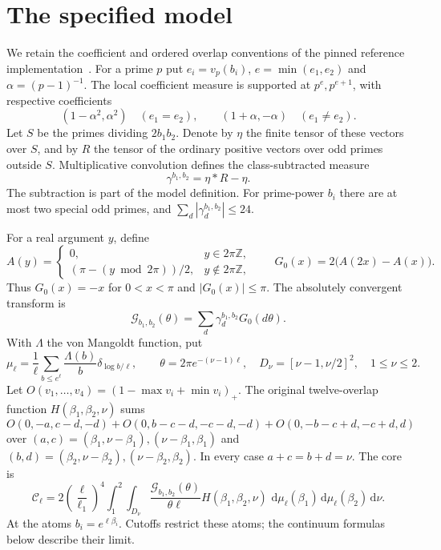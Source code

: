 \documentclass[11pt]{article}
\newcommand{\dd}{\,\mathrm d}
\newcommand{\Core}{\mathcal C}
\newcommand{\G}{\mathcal G}
\begin{document}
\section{The specified model}\label{sec:model}
We retain the coefficient and ordered overlap conventions of the
pinned reference implementation~\cite{reference}. For a prime $p$ put
$e_i=v_p(b_i)$, $e=\min(e_1,e_2)$ and $\alpha=(p-1)^{-1}$.
The local coefficient measure is supported at $p^e,p^{e+1}$, with
respective coefficients
\[
 (1-\alpha^2,\alpha^2)\quad(e_1=e_2),\qquad
 (1+\alpha,-\alpha)\quad(e_1\ne e_2).
\]
Let $S$ be the primes dividing $2b_1b_2$. Denote by $\eta$ the finite
tensor of these vectors over $S$, and by $R$ the tensor of the ordinary
positive vectors over odd primes outside $S$. Multiplicative
convolution defines the class-subtracted measure
\[
 \gamma^{b_1,b_2}=\eta*R-\eta.
\]
The subtraction is part of the model definition. For prime-power
$b_i$ there are at most two special odd primes, and
$\sum_d|\gamma_d^{b_1,b_2}|\leq24$.

For a real argument $y$, define
\[
 A(y)=
 \begin{cases}
 0,&y\in2\pi\mathbb Z,\\
 (\pi-(y\bmod2\pi))/2,&y\notin2\pi\mathbb Z,
 \end{cases}
 \qquad G_0(x)=2\bigl(A(2x)-A(x)\bigr).
\]
Thus $G_0(x)=-x$ for $0<x<\pi$ and $|G_0(x)|\leq\pi$.
The absolutely convergent transform is
\[
 \G_{b_1,b_2}(\theta)=\sum_d\gamma_d^{b_1,b_2}G_0(d\theta).
\]
With $\Lambda$ the von Mangoldt function, put
\[
 \mu_\ell=\frac1\ell\sum_{b\leq e^\ell}\frac{\Lambda(b)}b
           \delta_{\log b/\ell},\qquad
 \theta=2\pi e^{-(\nu-1)\ell},\quad
 D_\nu=[\nu-1,\nu/2]^2,\quad 1\leq\nu\leq2.
\]
Let $O(v_1,\ldots,v_4)=(1-\max v_i+\min v_i)_+$.
The original twelve-overlap function $H(\beta_1,\beta_2,\nu)$ sums
\[
 O(0,-a,c-d,-d)+O(0,b-c-d,-c-d,-d)
                    +O(0,-b-c+d,-c+d,d)
\]
over $(a,c)=(\beta_1,\nu-\beta_1),(\nu-\beta_1,\beta_1)$ and
$(b,d)=(\beta_2,\nu-\beta_2),(\nu-\beta_2,\beta_2)$.
In every case $a+c=b+d=\nu$.
The core is
\begin{equation}\label{eq:core}
 \Core_\ell=
 2\left(\frac{\ell}{\ell_1}\right)^4
 \int_1^2\int_{D_\nu}
 \frac{\G_{b_1,b_2}(\theta)}{\theta\ell}
 H(\beta_1,\beta_2,\nu)\,
 \dd\mu_\ell(\beta_1)\dd\mu_\ell(\beta_2)\dd\nu.
\end{equation}
At the atoms $b_i=e^{\ell\beta_i}$. Cutoffs restrict these atoms;
the continuum formulas below describe their limit.
\end{document}

